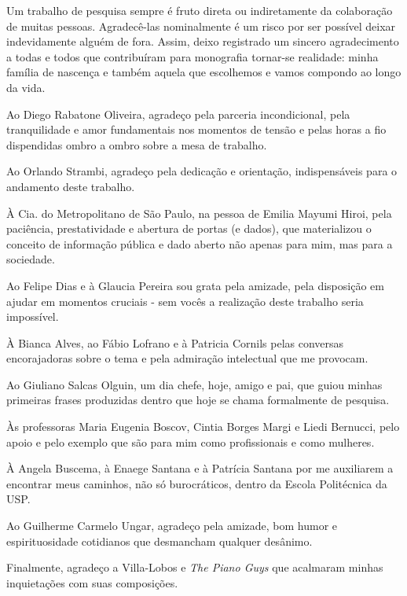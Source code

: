 \documentclass[
  12pt,        %
  openright,      %
  twoside,      %
  a4paper,      %
  english,      %
  brazil        %
]{abntex2}
\begin{document}
\begin{agradecimentos} 
Um trabalho de pesquisa sempre é fruto direta ou indiretamente da colaboração de muitas pessoas.
Agradecê-las nominalmente é um risco por ser possível deixar indevidamente alguém de fora.
Assim, deixo registrado um sincero agradecimento a todas e todos que contribuíram para monografia tornar-se realidade: minha família de nascença e também aquela que escolhemos e vamos compondo ao longo da vida.

Ao Diego Rabatone Oliveira, agradeço pela parceria incondicional, pela tranquilidade e amor fundamentais nos momentos de tensão e pelas horas a fio dispendidas ombro a ombro sobre a mesa de trabalho. 

Ao Orlando Strambi, agradeço pela dedicação e orientação, indispensáveis para o andamento deste trabalho.

À Cia. do Metropolitano de São Paulo, na pessoa de Emilia Mayumi Hiroi, pela paciência, prestatividade e abertura de portas (e dados), que materializou o conceito de informação pública e dado aberto não apenas para mim, mas para a sociedade.

Ao Felipe Dias e à Glaucia Pereira sou grata pela amizade, pela disposição em ajudar em momentos cruciais - sem vocês a realização deste trabalho seria impossível.

À Bianca Alves, ao Fábio Lofrano e à Patricia Cornils pelas conversas encorajadoras sobre o tema e pela admiração intelectual que me provocam.

Ao Giuliano Salcas Olguin, um dia chefe, hoje, amigo e pai, que guiou minhas primeiras frases produzidas dentro que hoje se chama formalmente de pesquisa.

Às professoras Maria Eugenia Boscov, Cintia Borges Margi e Liedi Bernucci, pelo apoio e pelo exemplo que são para mim como profissionais e como mulheres.

À Angela Buscema, à Enaege Santana e à Patrícia Santana por me auxiliarem a encontrar meus caminhos, não só burocráticos, dentro da Escola Politécnica da USP.

Ao Guilherme Carmelo Ungar, agradeço pela amizade, bom humor e espirituosidade cotidianos que desmancham qualquer desânimo.

Finalmente, agradeço a Villa-Lobos e \emph{The Piano Guys} que acalmaram minhas inquietações com suas composições.

\end{agradecimentos}
\end{document}
